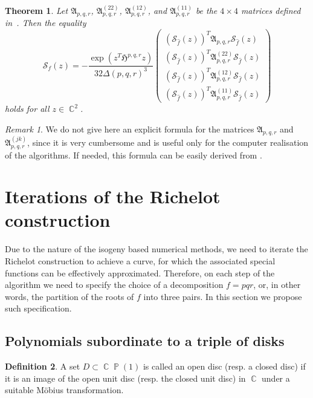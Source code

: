 \documentclass{amsart}
\numberwithin{equation}{section}
\newtheorem{theorem}{Theorem}[section]
\theoremstyle{definition}
\newtheorem{definition}[theorem]{Definition}
\theoremstyle{remark}
\newtheorem*{remark}{Remark}
\DeclareMathOperator{\CC}{\mathbb C}
\DeclareMathOperator{\PP}{\mathbb P}
\begin{document}
	
	\begin{theorem}\label{thMainTransformation}
		Let $\mathfrak A_{p,q,r}$, $\mathfrak A_{p,q,r}^{(22)}$, $\mathfrak A_{p,q,r}^{(12)}$, and $\mathfrak A_{p,q,r}^{(11)}$ be the $4 \times 4$ matrices defined in~\cite[Definition~4.5]{RichelotExpression}. Then the equality
		\begin{equation}\label{eqSMainTransform}
			\mathscr S_f(z) = -\frac{\exp\left(z^T\mathfrak H^{p,q,r}z\right)}{32\Delta(p,q,r)^3}\begin{pmatrix}
				\left(\mathscr S_{\hat f}(z)\right)^T \mathfrak A_{p,q,r}\mathscr S_{\hat f}(z) \\
				\left(\mathscr S_{\hat f}(z)\right)^T \mathfrak A_{p,q,r}^{(22)}\mathscr S_{\hat f}(z) \\
				\left(\mathscr S_{\hat f}(z)\right)^T \mathfrak A_{p,q,r}^{(12)}\mathscr S_{\hat f}(z) \\
				\left(\mathscr S_{\hat f}(z)\right)^T \mathfrak A^{(11)}_{p,q,r}\mathscr S_{\hat f}(z)
			\end{pmatrix}
		\end{equation} holds for all $z \in \CC^2$.
	\end{theorem}
	\begin{remark}
		We do not give here an explicit formula for the matrices $\mathfrak A_{p,q,r}$ and $\mathfrak A_{p,q,r}^{(jk)}$, since it is very cumbersome and is useful only for the computer realisation of the algorithms. If needed, this formula can be easily derived from \cite[Definition~4.5]{RichelotExpression}.
	\end{remark}
	
	
	
	\section{Iterations of the Richelot construction}\label{sec:Iter}
	
	Due to the nature of the isogeny based numerical methods, we need to iterate the Richelot construction to achieve a curve, for which the associated special functions can be effectively approximated. Therefore, on each step of the algorithm we need to specify the choice of a decomposition $f = pqr$, or, in other words, the partition of the roots of $f$ into three pairs. In this section we propose such specification.
	
	\subsection{Polynomials subordinate to a triple of disks}
	\begin{definition}
		A set $D \subset \CC\PP(1)$ is called an open disc (resp. a closed disc) if it is an image of the open unit disc (resp. the closed unit disc) in $\CC$ under a suitable M\"obius transformation.
	\end{definition}
	
\end{document}
